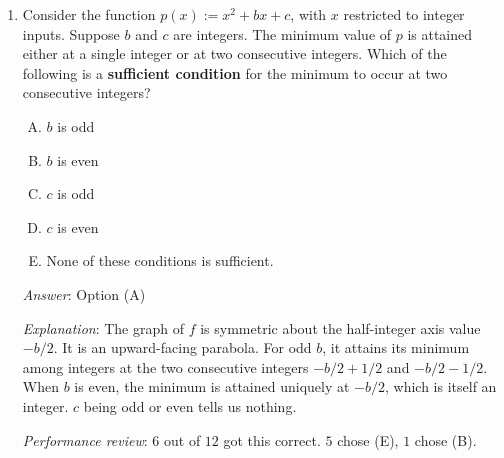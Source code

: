 \documentclass[10pt]{amsart}
\begin{document}
\begin{enumerate}
  {\em Answer}: Option (D).

  {\em Quick explanation}: This is a special case of the general
  Cobb-Douglas situation where we want to maximize $x^a(C - x)^b$. The
  general solution is to take $x = Ca/(a + b)$, i.e., to take $x$ and
  $C - x$ in the proportion of $a$ to $b$.

  {\em Full explanation}: We need to maximize $f(x) := x^2(12 - x)$,
  subject to $0 < x < 12$. Differentiating, we get $f'(x) = 3x(8 -
  x)$, so $8$ is a critical point. Further, we see that $f'$ is
  positive on $(0,8)$ and negative on $(8,12)$, so $f$ attains its
  maximum (in the interval $(0,12)$) at $8$.

  {\em Performance review}: Everybody got this correct.

  {\em Historical note (last year)}: $12$ out of $15$ people got this
  correct. $2$ people chose (E) and $1$ person chose (B). Of the
  people who got this correct, some seem to have computed the
  numerical values and others seem to have used calculus. Some who did
  not show any work may have used the general result of the
  Cobb-Douglas situation.
\item Consider the function $p(x) := x^2 + bx + c$, with $x$
  restricted to integer inputs. Suppose $b$ and $c$ are integers. The
  minimum value of $p$ is attained either at a single integer or at
  two consecutive integers. Which of the following is a {\bf
  sufficient condition} for the minimum to occur at two consecutive
  integers?

  \begin{enumerate}[(A)]
  \item $b$ is odd
  \item $b$ is even
  \item $c$ is odd
  \item $c$ is even
  \item None of these conditions is sufficient.
  \end{enumerate}

  {\em Answer}: Option (A)

  {\em Explanation}: The graph of $f$ is symmetric about the
  half-integer axis value $-b/2$. It is an upward-facing parabola. For
  odd $b$, it attains its minimum among integers at the two
  consecutive integers $-b/2 + 1/2$ and $-b/2 - 1/2$. When $b$ is
  even, the minimum is attained uniquely at $-b/2$, which is itself an
  integer. $c$ being odd or even tells us nothing.

  {\em Performance review}: $6$ out of $12$ got this correct. $5$
  chose (E), $1$ chose (B).


\end{enumerate}
\end{document}
